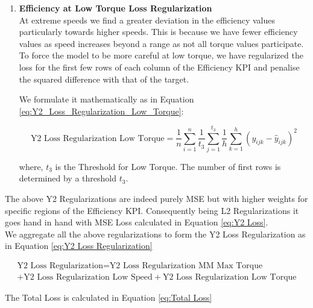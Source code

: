 \documentclass{report} %
\begin{document}
\begin{enumerate}
\item \textbf{Efficiency at Low Torque Loss Regularization} \\

At extreme speeds we find a greater deviation in the efficiency values particularly towards higher speeds. This is because we have fewer efficiency values as speed increases beyond a range as not all torque values participate.
To force the model to be more careful at low torque, we have regularized the loss for the first few rows of each column of the Efficiency \ac{KPI} and penalise the squared difference with that of the target.

We formulate it mathematically as in Equation \ref{eq:Y2_Loss_Regularization_Low_Torque}:

\begin{equation}
    \text{Y2 Loss Regularization Low Torque} = \frac{1}{n} \sum_{i=1}^{n} \frac{1}{t_{3}} \sum_{j=1}^{t_{3}} \frac{1}{h} \sum_{k=1}^{h} (y_{ijk} - \hat{y}_{ijk})^2
    \label{eq:Y2_Loss_Regularization_Low_Torque}
\end{equation}

where, \(t_{3}\) is the Threshold for Low Torque.
The number of first rows is determined by a threshold $t_{3}$.

\end{enumerate}

The above Y2 Regularizations are indeed purely \ac{MSE} but with higher weights for specific regions of the Efficiency \ac{KPI}.
Consequently being L2 Regularizations it goes hand in hand with \ac{MSE} Loss calculated in Equation \ref{eq:Y2 Loss}.\\

We aggregate all the above regularizations to form the Y2 Loss Regularization as in Equation \ref{eq:Y2 Loss Regularization}

\begin{equation}
    \begin{split}
\text{Y2 Loss Regularization} = \text{Y2 Loss Regularization MM Max Torque} \\
    + \text{Y2 Loss Regularization Low Speed} + \text{Y2 Loss Regularization Low Torque}
    \end{split}
    \label{eq:Y2 Loss Regularization}
\end{equation}


\vspace{0.2cm} %

The Total Loss is calculated in Equation \ref{eq:Total Loss}
\end{document}
